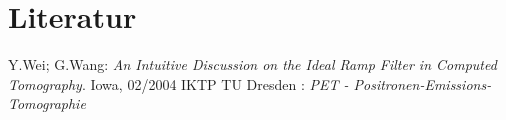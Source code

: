 \section{Literatur}

\begin{thebibliography}{99}
 Y.Wei; G.Wang: \textit{An Intuitive Discussion on the Ideal Ramp Filter in Computed Tomography}. Iowa, 02/2004 
 IKTP TU Dresden : \textit{PET - Positronen-Emissions-Tomographie}

\end{thebibliography}